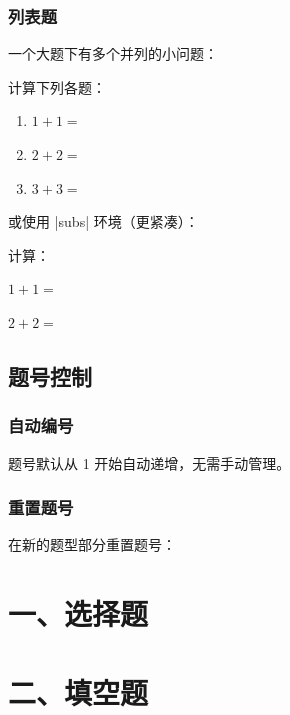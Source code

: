\subsubsection{列表题}

一个大题下有多个并列的小问题：

\begin{latexcode}
  \begin{question}
    计算下列各题：
    \begin{enumerate}
      \item $1 + 1 = $ \fillin[2]
      \item $2 + 2 = $ \fillin[4]
      \item $3 + 3 = $ \fillin[6]
    \end{enumerate}
  \end{question}
\end{latexcode}

或使用 |subs| 环境（更紧凑）：

\begin{latexcode}
  \begin{question}
    计算：
    \begin{subs}
      \item $1 + 1 = $ \fillin[2]
      \item $2 + 2 = $ \fillin[4]
    \end{subs}
  \end{question}
\end{latexcode}


\subsection{题号控制}

\subsubsection{自动编号}

题号默认从 1 开始自动递增，无需手动管理。

\subsubsection{重置题号}

在新的题型部分重置题号：

\begin{latexcode}
  \section{一、选择题}
  \begin{question}
  \end{question}

  \section{二、填空题}
  \begin{question}
  \end{question}
\end{latexcode}

